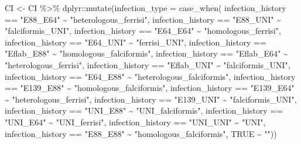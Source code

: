 \documentclass[
]{article}
\newenvironment{Shaded}{\begin{snugshade}}{\end{snugshade}}
\newcommand{\AttributeTok}[1]{\textcolor[rgb]{0.77,0.63,0.00}{#1}}
\newcommand{\ConstantTok}[1]{\textcolor[rgb]{0.00,0.00,0.00}{#1}}
\newcommand{\FunctionTok}[1]{\textcolor[rgb]{0.00,0.00,0.00}{#1}}
\newcommand{\NormalTok}[1]{#1}
\newcommand{\OtherTok}[1]{\textcolor[rgb]{0.56,0.35,0.01}{#1}}
\newcommand{\SpecialCharTok}[1]{\textcolor[rgb]{0.00,0.00,0.00}{#1}}
\newcommand{\StringTok}[1]{\textcolor[rgb]{0.31,0.60,0.02}{#1}}
\begin{document}
\begin{Shaded}
\begin{Highlighting}[]
\NormalTok{CI }\OtherTok{\textless{}{-}}\NormalTok{ CI }\SpecialCharTok{\%\textgreater{}\%}
\NormalTok{  dplyr}\SpecialCharTok{::}\FunctionTok{mutate}\NormalTok{(}\AttributeTok{infection\_type =} \FunctionTok{case\_when}\NormalTok{(}
\NormalTok{    infection\_history }\SpecialCharTok{==} \StringTok{"E88\_E64"} \SpecialCharTok{\textasciitilde{}} \StringTok{"heterologous\_ferrisi"}\NormalTok{,}
\NormalTok{    infection\_history }\SpecialCharTok{==} \StringTok{"E88\_UNI"} \SpecialCharTok{\textasciitilde{}} \StringTok{"falciformis\_UNI"}\NormalTok{,}
\NormalTok{    infection\_history }\SpecialCharTok{==} \StringTok{"E64\_E64"} \SpecialCharTok{\textasciitilde{}} \StringTok{"homologous\_ferrisi"}\NormalTok{,}
\NormalTok{    infection\_history }\SpecialCharTok{==} \StringTok{"E64\_UNI"} \SpecialCharTok{\textasciitilde{}} \StringTok{"ferrisi\_UNI"}\NormalTok{,}
\NormalTok{    infection\_history }\SpecialCharTok{==} \StringTok{"Eflab\_E88"} \SpecialCharTok{\textasciitilde{}} \StringTok{"homologous\_falciformis"}\NormalTok{,}
\NormalTok{    infection\_history }\SpecialCharTok{==} \StringTok{"Eflab\_E64"} \SpecialCharTok{\textasciitilde{}} \StringTok{"heterologous\_ferrisi"}\NormalTok{,}
\NormalTok{    infection\_history }\SpecialCharTok{==} \StringTok{"Eflab\_UNI"} \SpecialCharTok{\textasciitilde{}} \StringTok{"falciformis\_UNI"}\NormalTok{,}
\NormalTok{    infection\_history }\SpecialCharTok{==} \StringTok{"E64\_E88"} \SpecialCharTok{\textasciitilde{}} \StringTok{"heterologous\_falciformis"}\NormalTok{,}
\NormalTok{    infection\_history }\SpecialCharTok{==} \StringTok{"E139\_E88"} \SpecialCharTok{\textasciitilde{}} \StringTok{"homologous\_falciformis"}\NormalTok{,}
\NormalTok{    infection\_history }\SpecialCharTok{==} \StringTok{"E139\_E64"} \SpecialCharTok{\textasciitilde{}} \StringTok{"heterologous\_ferrisi"}\NormalTok{,}
\NormalTok{    infection\_history }\SpecialCharTok{==} \StringTok{"E139\_UNI"} \SpecialCharTok{\textasciitilde{}} \StringTok{"falciformis\_UNI"}\NormalTok{,}
\NormalTok{    infection\_history }\SpecialCharTok{==} \StringTok{"UNI\_E88"} \SpecialCharTok{\textasciitilde{}} \StringTok{"UNI\_falciformis"}\NormalTok{,}
\NormalTok{    infection\_history }\SpecialCharTok{==} \StringTok{"UNI\_E64"} \SpecialCharTok{\textasciitilde{}} \StringTok{"UNI\_ferrisi"}\NormalTok{,}
\NormalTok{    infection\_history }\SpecialCharTok{==} \StringTok{"UNI\_UNI"} \SpecialCharTok{\textasciitilde{}} \StringTok{"UNI"}\NormalTok{,}
\NormalTok{    infection\_history }\SpecialCharTok{==} \StringTok{"E88\_E88"} \SpecialCharTok{\textasciitilde{}} \StringTok{"homologous\_falciformis"}\NormalTok{,}
    \ConstantTok{TRUE} \SpecialCharTok{\textasciitilde{}} \StringTok{""}\NormalTok{))}
\end{Highlighting}
\end{Shaded}
\end{document}

